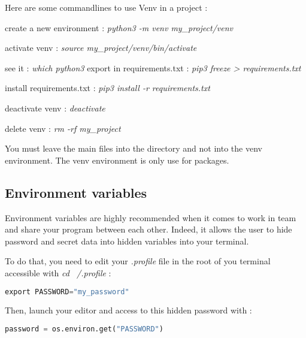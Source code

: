 \documentclass[a4paper, 12pt, titlepage]{scrartcl} %
\begin{document}
\vspace{5mm}

Here are some commandlines to use Venv in a project :

create a new environment : \textit{python3 -m venv my\_project/venv}

activate venv : \textit{source my\_project/venv/bin/activate}

see it : \textit{which python3}
export in requirements.txt : \textit{pip3 freeze > requirements.txt}

install requirements.txt : \textit{pip3 install -r requirements.txt}

deactivate venv : \textit{deactivate}

delete venv : \textit{rm -rf my\_project}

\vspace{5mm}

You must leave the main files into the directory and not into the venv environment. The venv environment is only use for packages.

\subsection{Environment variables}
\label{subsec:EnvironmentVariables}
Environment variables are highly recommended when it comes to work in team and share your program between each other. Indeed, it allows the user to hide password and secret data into hidden variables into your terminal.

To do that, you need to edit your \textit{.profile} file in the root of you terminal accessible with \textit{cd ~/.profile} :
\begin{lstlisting}[language=Python]
export PASSWORD="my_password"
\end{lstlisting} \vspace{5mm}

Then, launch your editor and access to this hidden password with :
\begin{lstlisting}[language=Python]
password = os.environ.get("PASSWORD")
\end{lstlisting} \vspace{5mm}
\end{document}
